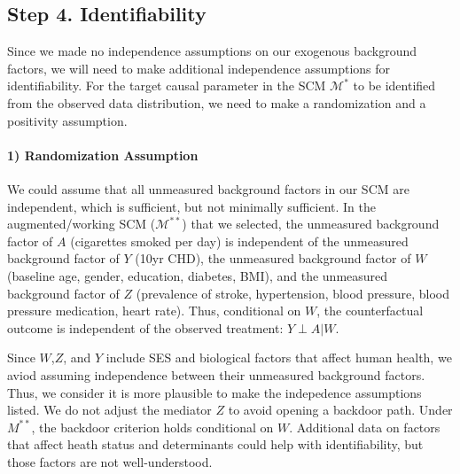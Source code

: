 \documentclass[]{article}
\let\oldparagraph\paragraph
\renewcommand{\paragraph}[1]{\oldparagraph{#1}\mbox{}}
\begin{document}
\hypertarget{step-4.-identifiability}{%
\subsection{Step 4. Identifiability}\label{step-4.-identifiability}}

Since we made no independence assumptions on our exogenous background
factors, we will need to make additional independence assumptions for
identifiability. For the target causal parameter in the SCM
\(\mathcal{M^*}\) to be identified from the observed data distribution,
we need to make a randomization and a positivity assumption.

\hypertarget{randomization-assumption}{%
\paragraph{1) Randomization Assumption}\label{randomization-assumption}}

We could assume that all unmeasured background factors in our SCM are
independent, which is sufficient, but not minimally sufficient. In the
augmented/working SCM (\(\mathcal{M^{**}}\)) that we selected, the
unmeasured background factor of \(A\) (cigarettes smoked per day) is
independent of the unmeasured background factor of \(Y\) (10yr CHD), the
unmeasured background factor of \(W\) (baseline age, gender, education,
diabetes, BMI), and the unmeasured background factor of \(Z\)
(prevalence of stroke, hypertension, blood pressure, blood pressure
medication, heart rate). Thus, conditional on \(W\), the counterfactual
outcome is independent of the observed treatment: \(Y \perp A|W\).

Since \(W\),\(Z\), and \(Y\) include SES and biological factors that
affect human health, we aviod assuming independence between their
unmeasured background factors. Thus, we consider it is more plausible to
make the indepedence assumptions listed. We do not adjust the mediator
\(Z\) to avoid opening a backdoor path. Under \(M^{**}\), the backdoor
criterion holds conditional on \(W\). Additional data on factors that
affect heath status and determinants could help with identifiability,
but those factors are not well-understood.
\end{document}
